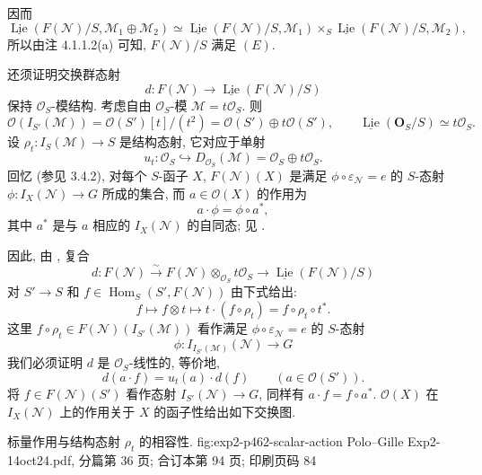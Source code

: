 因而
\begin{equation*}
 \underline{\operatorname{Lie}}
   (F(\mathcal N)/S,\mathcal M_1\oplus\mathcal M_2)
 \simeq
 \underline{\operatorname{Lie}}(F(\mathcal N)/S,\mathcal M_1)
 \times_S
 \underline{\operatorname{Lie}}(F(\mathcal N)/S,\mathcal M_2),
 \tag{2}\label{sga3:ii:lemma:4-6-2:equation:2}
\end{equation*}
所以由注 4.1.1.2(a) 可知, \(F(\mathcal N)/S\) 满足 \((E)\).

还须证明交换群态射
\[
 d:F(\mathcal N)\longrightarrow
 \underline{\operatorname{Lie}}(F(\mathcal N)/S)
\]
保持 \(\mathcal O_S\)-模结构. 考虑自由
\(\mathcal O_S\)-模 \(\mathcal M=t\mathcal O_S\). 则
\[
 \mathcal O(I_{S'}(\mathcal M))
 =\mathcal O(S')[t]/(t^2)
 =\mathcal O(S')\oplus t\mathcal O(S'),
 \qquad
 \underline{\operatorname{Lie}}(\mathbf O_S/S)\simeq t\mathcal O_S.
\]
设 \(\rho_t:I_S(\mathcal M)\to S\) 是结构态射,
它对应于单射
\[
 u_t:\mathcal O_S\hookrightarrow
 D_{\mathcal O_S}(\mathcal M)
 =\mathcal O_S\oplus t\mathcal O_S.
\]
回忆 (参见 3.4.2), 对每个 \(S\)-函子 \(X\),
\(F(\mathcal N)(X)\) 是满足
\(\phi\circ\varepsilon_{\mathcal N}=e\) 的 \(S\)-态射
\(\phi:I_X(\mathcal N)\to G\) 所成的集合,
而 \(a\in\mathcal O(X)\) 的作用为
\[
 a\cdot\phi=\phi\circ a^*,
\]
其中 \(a^*\) 是与 \(a\) 相应的 \(I_X(\mathcal N)\) 的自同态;
见 .

因此, 由 , 复合
\[
 d:F(\mathcal N)\xrightarrow{\sim}
 F(\mathcal N)\otimes_{\mathcal O_S}t\mathcal O_S
 \longrightarrow
 \underline{\operatorname{Lie}}(F(\mathcal N)/S)
\]
对 \(S'\to S\) 和
\(f\in\operatorname{Hom}_S(S',F(\mathcal N))\) 由下式给出:
\[
 f\longmapsto f\otimes t
 \longmapsto t\cdot(f\circ\rho_t)
 =f\circ\rho_t\circ t^*.
\]
这里 \(f\circ\rho_t\in F(\mathcal N)(I_{S'}(\mathcal M))\)
看作满足 \(\phi\circ\varepsilon_{\mathcal N}=e\) 的 \(S\)-态射
\[
 \phi:I_{I_{S'}(\mathcal M)}(\mathcal N)\longrightarrow G
\]
我们必须证明 \(d\) 是 \(\mathcal O_S\)-线性的, 等价地,
\[
 d(a\cdot f)=u_t(a)\cdot d(f)
 \qquad(a\in\mathcal O(S')).
\]
将 \(f\in F(\mathcal N)(S')\) 看作态射
\(I_{S'}(\mathcal N)\to G\), 同样有
\(a\cdot f=f\circ a^*\). \(\mathcal O(X)\) 在
\(I_X(\mathcal N)\) 上的作用关于 \(X\) 的函子性给出如下交换图.

  {标量作用与结构态射 \(\rho_t\) 的相容性.}
  {fig:exp2-p462-scalar-action}
  {Polo--Gille Exp2-14oct24.pdf, 分篇第 36 页; 合订本第 94 页; 印刷页码 84}

